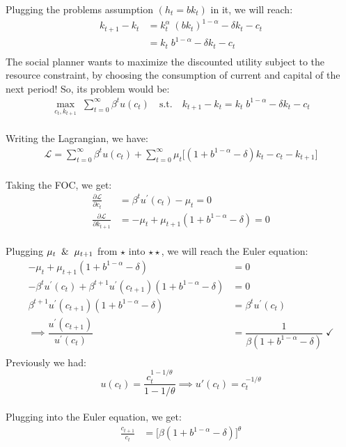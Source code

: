 \documentclass[12pt]{extarticle}
\newcommand{\rond}[2]{\frac{\partial #1}{\partial #2}}
\newcommand{\ones}{$\star$}
\newcommand{\twos}{$\star\star$}
\newcommand{\threes}{$\star\star\star$}
\begin{document}
Plugging the problems assumption $(h_t=bk_t)$ in it, we will reach: 
\begin{align*}
    k_{t+1} -  k_t & = k_t^{\alpha}\;(bk_t)^{1-\alpha} -\delta k_t - c_t\\
    & = k_t\;b^{1-\alpha} -\delta k_t - c_t\\
\end{align*}
The social planner wants to maximize the discounted utility subject to the resource constraint, by choosing the consumption of current and capital of the next period!
So, its problem would be:
\begin{align*}
    \max_{c_t, k_{t+1}} \; \sum_{t=0}^{\infty} \beta^{t} u(c_t) \quad \text{s.t.} \quad
    k_{t+1} -  k_t = k_t\;b^{1-\alpha} -\delta k_t - c_t
\end{align*}\\
Writing the Lagrangian, we have:
\begin{align*}
    \mathcal{L} = \sum_{t=0}^{\infty} \beta^{t} u(c_t) + \sum_{t=0}^{\infty}
    \mu_t\biggl[(1 + b^{1-\alpha} - \delta) k_t - c_t - k_{t+1}\biggr]
\end{align*}\\
Taking the FOC, we get:
\begin{align*}
    \rond{\mathcal{L}}{c_t} &= \beta^{t} u^\prime(c_t) - \mu_t = 0 \tag{\ones}\\
    \rond{\mathcal{L}}{k_{t+1}} &= -\mu_t + \mu_{t+1} (1 + b^{1-\alpha}-\delta) = 0 \tag{\twos}
\end{align*}\\
Plugging $\mu_{t} \And \mu_{t+1}$ from \ones\; into \twos, we will reach the Euler equation:
\begin{align*}
    -\mu_t + \mu_{t+1} (1 + b^{1-\alpha}-\delta) &= 0 \\
    -\beta^{t} u^\prime(c_t) + \beta^{t+1} u^\prime(c_{t+1}) (1 + b^{1-\alpha}-\delta) &= 0\\
    \beta^{t+1} u^\prime(c_{t+1}) (1 + b^{1-\alpha}-\delta) &= \beta^{t} u^\prime(c_t)\\
    \implies\dfrac{u^\prime(c_{t+1}) }{u^\prime(c_t)} &= \dfrac{1}{\beta (1 + b^{1-\alpha}-\delta)}\; \checkmark\\
\end{align*}
Previously we had:
$$u(c_t) = \dfrac{c_t^{1-1/\theta}}{1-1/\theta} \implies u'(c_t)=c_t^{-1/\theta}$$\\
Plugging into the Euler equation, we get:
\begin{align*}
    \frac{c_{t+1}}{c_t} &= \bigl[\beta(1 + b^{1-\alpha} - \delta)\bigr]^{\theta} \tag{\threes}
\end{align*}\\
\end{document}
